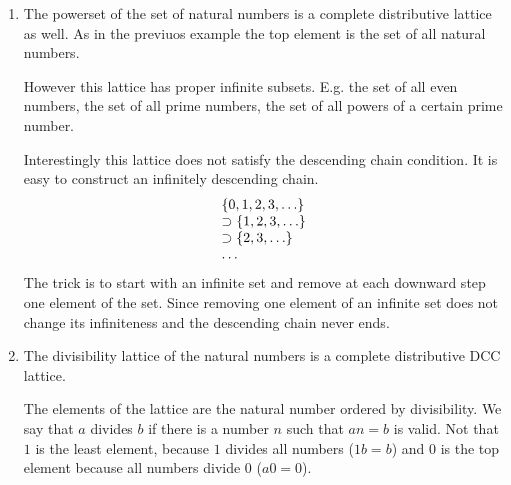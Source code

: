 \begin{enumerate}
    \item The powerset of the set of natural numbers is a complete distributive
        lattice as well. As in the previuos example the top element is the set
        of all natural numbers.

        However this lattice has proper infinite subsets. E.g. the set of all
        even numbers, the set of all prime numbers, the set of all powers of a
        certain prime number.

        Interestingly this lattice does not satisfy the descending chain
        condition. It is easy to construct an infinitely descending chain.
        $$
        \begin{array}{lllll} 
            \left\{0, 1, 2, 3, \ldots\right\}
            \\
            \supset \left\{1, 2, 3, \ldots\right\}
            \\
            \supset \left\{2, 3, \ldots\right\}
            \\
            \ldots
         \end{array}
        $$
        The trick is to start with an infinite set and remove at each downward
        step one element of the set. Since removing one element of an infinite
        set does not change its infiniteness and the descending chain never ends.

    \item The divisibility lattice of the natural numbers is a complete
        distributive DCC lattice.

        The elements of the lattice are the natural number ordered by
        divisibility. We say that $a$ divides $b$ if there is a number $n$ such
        that $a n = b$ is valid. Not that $1$ is the least element, because $1$
        divides all numbers ($1 b = b$) and $0$ is the top element because all
        numbers divide 0 ($a 0 = 0$).
\end{enumerate}


